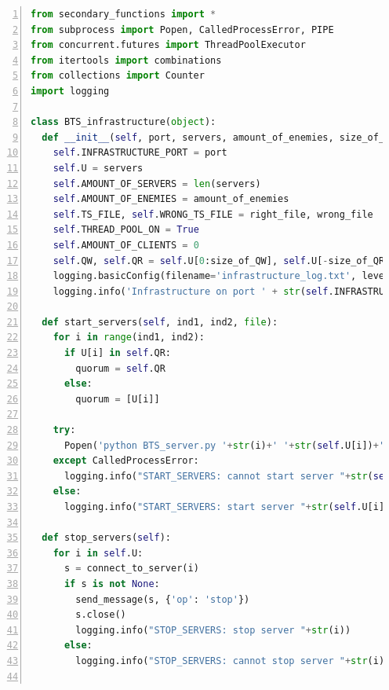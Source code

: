 \begin{ListingEnv}[p]\caption{Класс~\texttt{\small BTS_infrastructure}, модуль~\texttt{\small BTS_infrastructure}}\label{list:bts1}
\begin{lstlisting}[language=Python, numbers=left]
from secondary_functions import *
from subprocess import Popen, CalledProcessError, PIPE
from concurrent.futures import ThreadPoolExecutor
from itertools import combinations
from collections import Counter
import logging

class BTS_infrastructure(object):
  def __init__(self, port, servers, amount_of_enemies, size_of_QW, size_of_QR, right_file, wrong_file):
    self.INFRASTRUCTURE_PORT = port
    self.U = servers
    self.AMOUNT_OF_SERVERS = len(servers)
    self.AMOUNT_OF_ENEMIES = amount_of_enemies
    self.TS_FILE, self.WRONG_TS_FILE = right_file, wrong_file
    self.THREAD_POOL_ON = True
    self.AMOUNT_OF_CLIENTS = 0
    self.QW, self.QR = self.U[0:size_of_QW], self.U[-size_of_QR:]
    logging.basicConfig(filename='infrastructure_log.txt', level=logging.DEBUG, format="%(asctime)s - %(message)s")
    logging.info('Infrastructure on port ' + str(self.INFRASTRUCTURE_PORT))

  def start_servers(self, ind1, ind2, file):
    for i in range(ind1, ind2):
      if U[i] in self.QR:
        quorum = self.QR
      else:
        quorum = [U[i]]

    try:
      Popen('python BTS_server.py '+str(i)+' '+str(self.U[i])+' '+str(file)+' '+''.join(str(j)+' ' for j in quorum), stdout=PIPE, stderr=PIPE, shell=True)
    except CalledProcessError:
      logging.info("START_SERVERS: cannot start server "+str(self.U[i]))
    else:
      logging.info("START_SERVERS: start server "+str(self.U[i]))

  def stop_servers(self):
    for i in self.U:
      s = connect_to_server(i)
      if s is not None:
        send_message(s, {'op': 'stop'})
        s.close()
        logging.info("STOP_SERVERS: stop server "+str(i))
      else:
        logging.info("STOP_SERVERS: cannot stop server "+str(i))
        
\end{lstlisting}
\end{ListingEnv}
